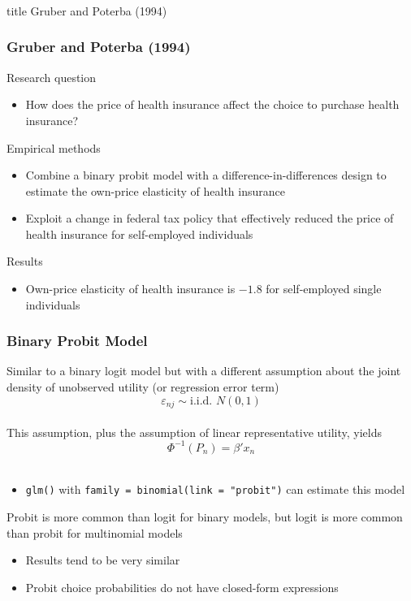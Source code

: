 \documentclass{beamer}\usepackage[]{graphicx}\usepackage[]{color}
\begin{document}
\begin{frame}\frametitle{}
    \vfill
    \centering
    \begin{beamercolorbox}[center]{title}
        \Large Gruber and Poterba (1994)
    \end{beamercolorbox}
    \vfill
\end{frame}

\begin{frame}\frametitle{Gruber and Poterba (1994)}
    Research question
    \begin{itemize}
    	\item How does the price of health insurance affect the choice to purchase health insurance?
    \end{itemize}
    \vspace{2ex}
    Empirical methods
    \begin{itemize}
    	\item Combine a binary probit model with a difference-in-differences design to estimate the own-price elasticity of health insurance
    	\item Exploit a change in federal tax policy that effectively reduced the price of health insurance for self-employed individuals
    \end{itemize}
    \vspace{2ex}
    Results
    \begin{itemize}
    	\item Own-price elasticity of health insurance is $-1.8$ for self-employed single individuals
    \end{itemize}
\end{frame}

\begin{frame}\frametitle{Binary Probit Model}
    Similar to a binary logit model but with a different assumption about the joint density of unobserved utility (or regression error term)
    $$\varepsilon_{nj} \sim \text{i.i.d.\ } N(0, 1)$$ \\
    \vspace{2ex}
    This assumption, plus the assumption of linear representative utility, yields
    $$\Phi^{-1}(P_n) = \beta' x_n$$ \\
    \vspace{-2ex}
    \begin{itemize}
    	\item \texttt{glm()} with \texttt{family = binomial(link = "probit")} can estimate this model
    \end{itemize}
    \vspace{2ex}
    Probit is more common than logit for binary models, but logit is more common than probit for multinomial models
    \begin{itemize}
    	\item Results tend to be very similar
    	\item Probit choice probabilities do not have closed-form expressions
    \end{itemize}
\end{frame}
\end{document}
